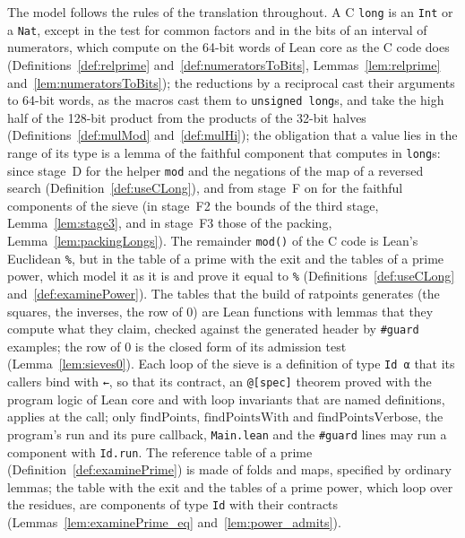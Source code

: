The model follows the rules of the translation throughout. A C \verb|long| is an \verb|Int| or a
\verb|Nat|, except in the test for common factors and in the bits of an interval of numerators,
which compute on the 64-bit words of Lean core as the C code does (Definitions~\ref{def:relprime}
and~\ref{def:numeratorsToBits}, Lemmas~\ref{lem:relprime} and~\ref{lem:numeratorsToBits}); the
reductions by a reciprocal cast their arguments to 64-bit words, as the macros cast them to
\verb|unsigned long|s, and take the high half of the 128-bit product from the products of the 32-bit
halves (Definitions~\ref{def:mulMod} and~\ref{def:mulHi}); the obligation that a value lies in the
range of its type is a lemma of the faithful component that computes in \verb|long|s: since stage~D
for the helper \verb|mod| and the negations of the map of a reversed search
(Definition~\ref{def:useCLong}), and from stage~F on for the faithful components of the sieve (in
stage~F2 the bounds of the third stage, Lemma~\ref{lem:stage3}, and in stage~F3 those of the
packing, Lemma~\ref{lem:packingLongs}). The remainder \verb|mod()| of the C code is Lean's Euclidean
\verb|%|, but in the table of a prime with the exit and the tables of a prime power, which model it
as it is and prove it equal to \verb|%| (Definitions~\ref{def:useCLong} and~\ref{def:examinePower}).
The tables that the build of ratpoints generates (the squares, the inverses, the row of $0$) are
Lean functions with lemmas that they compute what they claim, checked against the generated header
by \verb|#guard| examples; the row of $0$ is the closed form of its admission test
(Lemma~\ref{lem:sieves0}). Each loop of the sieve is a definition of type \verb|Id α| that its
callers bind with \verb|←|, so that its contract, an \verb|@[spec]| theorem proved with the program
logic of Lean core and with loop invariants that are named definitions, applies at the call; only
$\mathrm{findPoints}$, $\mathrm{findPointsWith}$ and $\mathrm{findPointsVerbose}$, the program's run
and its pure callback, \verb|Main.lean| and the \verb|#guard| lines may run a component with
\verb|Id.run|. The reference table of a prime (Definition~\ref{def:examinePrime}) is made of folds
and maps, specified by ordinary lemmas; the table with the exit and the tables of a prime power,
which loop over the residues, are components of type \verb|Id| with their contracts
(Lemmas~\ref{lem:examinePrime_eq} and~\ref{lem:power_admits}).

